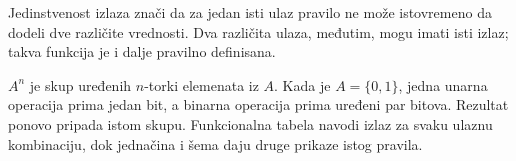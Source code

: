 
Jedinstvenost izlaza znači da za jedan isti ulaz pravilo ne može istovremeno da dodeli dve različite vrednosti. Dva različita ulaza, međutim, mogu imati isti izlaz; takva funkcija je i dalje pravilno definisana.

\(A^n\) je skup uređenih \(n\)-torki elemenata iz \(A\). Kada je \(A=\{0,1\}\), jedna unarna operacija prima jedan bit, a binarna operacija prima uređeni par bitova. Rezultat ponovo pripada istom skupu. Funkcionalna tabela navodi izlaz za svaku ulaznu kombinaciju, dok jednačina i šema daju druge prikaze istog pravila.

